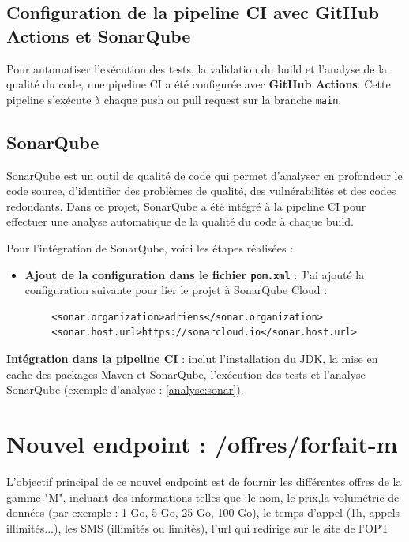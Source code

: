 \documentclass{article}
\begin{document}
	\subsection{Configuration de la pipeline CI avec GitHub Actions et SonarQube}
	Pour automatiser l'exécution des tests, la validation du build et l'analyse de la qualité du code, une pipeline CI a été configurée avec \textbf{GitHub Actions}. Cette pipeline s'exécute à chaque push ou pull request sur la branche \texttt{main}.
	
	\subsection{SonarQube}
	SonarQube est un outil de qualité de code qui permet d'analyser en profondeur le code source, d'identifier des problèmes de qualité, des vulnérabilités et des codes redondants. Dans ce projet, SonarQube a été intégré à la pipeline CI pour effectuer une analyse automatique de la qualité du code à chaque build.
	
	Pour l'intégration de SonarQube, voici les étapes réalisées :
	\begin{itemize}
		\item \textbf{Ajout de la configuration dans le fichier \texttt{pom.xml}} : J'ai ajouté la configuration suivante pour lier le projet à SonarQube Cloud :
	\end{itemize}
	\begin{verbatim}
		<sonar.organization>adriens</sonar.organization>
		<sonar.host.url>https://sonarcloud.io</sonar.host.url>
	\end{verbatim}
	
	\noindent
	\textbf{Intégration dans la pipeline CI} : inclut l'installation du JDK, la mise en cache des packages Maven et SonarQube, l'exécution des tests et l'analyse SonarQube (exemple d'analyse : \ref{analyse:sonar}).

	\section{Nouvel endpoint : /offres/forfait-m}
	L'objectif principal de ce nouvel endpoint est de fournir les différentes offres de la gamme "M", incluant des informations telles que :le nom, le prix,la volumétrie de données (par exemple : 1 Go, 5 Go, 25 Go, 100 Go), le temps d'appel (1h, appels illimités...), les SMS (illimités ou limités), l'url qui redirige sur le site de l'OPT
\end{document}

